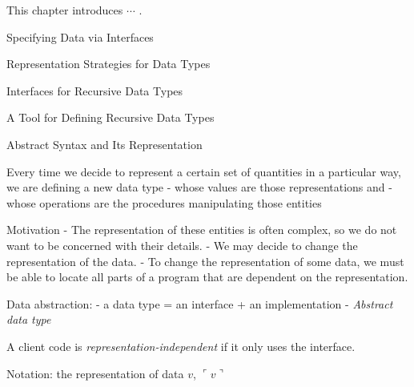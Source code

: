\documentclass{article}
\newcommand{\rep}[1]{\ulcorner #1 \urcorner}
\begin{document}
\begin{huge}

\sf



This chapter introduces $\cdots$ . 

\blob Specifying Data via Interfaces

\blob Representation Strategies for Data Types

\blob Interfaces for Recursive Data Types

\blob A Tool for Defining Recursive Data Types

\blob Abstract Syntax and Its Representation

Every time we decide to represent a certain set of quantities in a particular way, we are defining a new data type  \al
- whose values are those representations and \al
- whose operations are the procedures manipulating those entities \al

Motivation\al
- The representation of these entities is often complex, so we do 
not want to be concerned with their details. \al 
- We may decide to change the representation of the data. \al
- To change the representation of some data, we must be able to locate all parts of a program that are dependent on the representation.


Data abstraction:  \al
- a data type = an interface + an implementation \al
- {\it Abstract data type}

A client code is {\it representation-independent} if it only uses the interface.



Notation: the representation of data $v$, $\rep{v}$


\end{huge}
\end{document}
